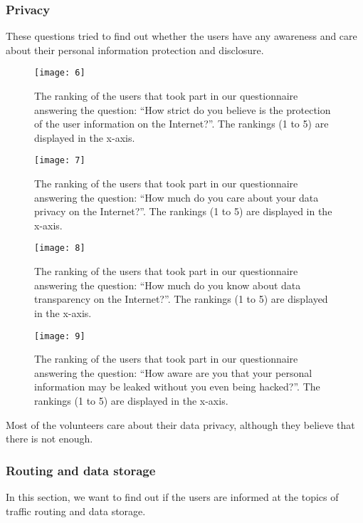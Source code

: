 \subsubsection{Privacy}

These questions tried to find out whether the users have any awareness and care 
about their personal information protection and disclosure.

\begin{figure}[H]
\centering
\texttt{[image: 6]}
\caption{The ranking of the users that took part in our questionnaire answering
the question: ``How strict do you believe is the protection of the user 
information on the Internet?''. The rankings (1 to 5) are displayed in the 
x-axis.}
\end{figure}

\begin{figure}[H]
\centering
\texttt{[image: 7]}
\caption{The ranking of the users that took part in our questionnaire answering
the question: ``How much do you care about your data privacy on the Internet?''. 
The rankings (1 to 5) are displayed in the x-axis.}
\end{figure}

\begin{figure}[H]
\centering
\texttt{[image: 8]}
\caption{The ranking of the users that took part in our questionnaire answering
the question: ``How much do you know about data transparency on the Internet?''. 
The rankings (1 to 5) are displayed in the x-axis.}
\end{figure}

\begin{figure}[H]
\centering
\texttt{[image: 9]}
\caption{The ranking of the users that took part in our questionnaire answering
the question: ``How aware are you that your personal information may be leaked 
without you even being hacked?''. The rankings (1 to 5) are displayed in the 
x-axis.}
\end{figure}

Most of the volunteers care about their data privacy, although they believe that 
there is not enough.

\subsubsection{Routing and data storage}

In this section, we want to find out if the users are informed at the topics of 
traffic routing and  data storage.

